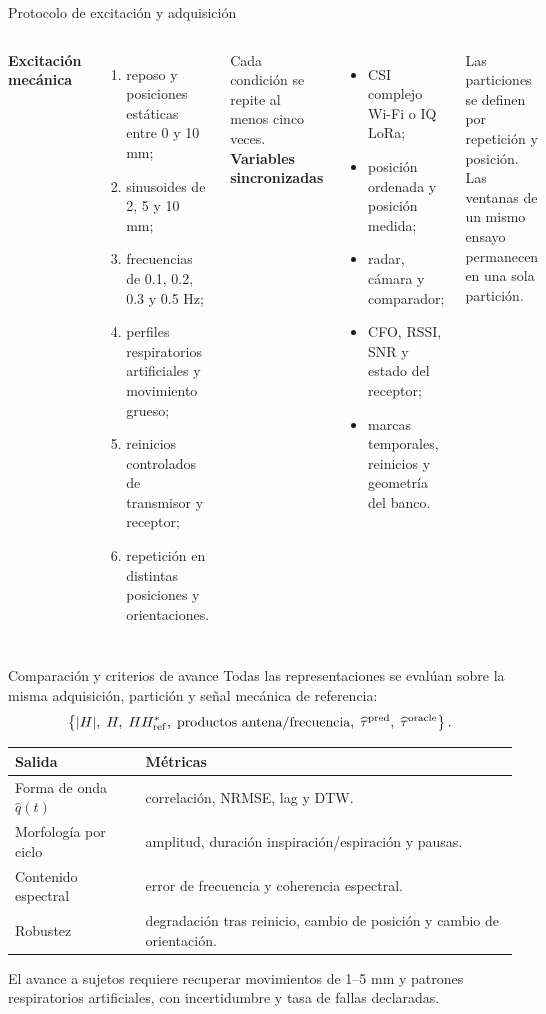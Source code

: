 \documentclass[10pt,aspectratio=169]{beamer}
\begin{document}
\begin{frame}{Protocolo de excitación y adquisición}
\small
\begin{columns}[T]
\textbf{Excitación mecánica}
\begin{enumerate}
\item reposo y posiciones estáticas entre 0 y 10 mm;
\item sinusoides de 2, 5 y 10 mm;
\item frecuencias de 0.1, 0.2, 0.3 y 0.5 Hz;
\item perfiles respiratorios artificiales y movimiento grueso;
\item reinicios controlados de transmisor y receptor;
\item repetición en distintas posiciones y orientaciones.
\end{enumerate}
Cada condición se repite al menos cinco veces.
\textbf{Variables sincronizadas}
\begin{itemize}
\item CSI complejo Wi-Fi o IQ LoRa;
\item posición ordenada y posición medida;
\item radar, cámara y comparador;
\item CFO, RSSI, SNR y estado del receptor;
\item marcas temporales, reinicios y geometría del banco.
\end{itemize}
Las particiones se definen por repetición y posición. Las ventanas de un mismo ensayo
permanecen en una sola partición.
\end{columns}
\end{frame}

\begin{frame}{Comparación y criterios de avance}
\small
Todas las representaciones se evalúan sobre la misma adquisición, partición y señal
mecánica de referencia:
\begin{equation*}
\left\{|H|,\;H,\;HH_{\rm ref}^*,\;\text{productos antena/frecuencia},\;
\widehat\tau^{\rm pred},\;\widehat\tau^{\rm oracle}\right\}.
\end{equation*}
\begin{tabularx}{\textwidth}{p{3.4cm}Y}
\toprule
Salida & Métricas\\
\midrule
Forma de onda $\widehat q(t)$ & correlación, NRMSE, lag y DTW.\\
Morfología por ciclo & amplitud, duración inspiración/espiración y pausas.\\
Contenido espectral & error de frecuencia y coherencia espectral.\\
Robustez & degradación tras reinicio, cambio de posición y cambio de orientación.\\
\bottomrule
\end{tabularx}
\vspace{0.2cm}
El avance a sujetos requiere recuperar movimientos de 1--5 mm y patrones
respiratorios artificiales, con incertidumbre y tasa de fallas declaradas.
\end{frame}
\end{document}
